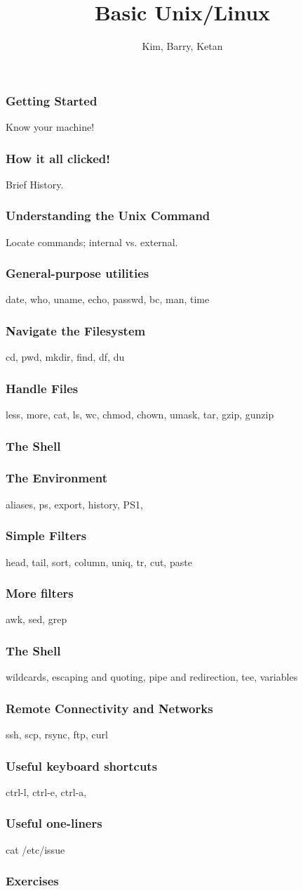 \documentclass[hyperref={pdfpagelabels=false},12pt]{beamer}
\title[Basic Unix/Linux]{{Basic Unix/Linux}}
\author[Basic Unix/Linux]{{Kim, Barry, Ketan}}
\date{}
\begin{document}
\begin{frame}[plain]
\titlepage
\end{frame}

\begin{frame}
\frametitle{Getting Started}
\centering
Know your machine!
\end{frame}

\begin{frame}
\frametitle{How it all clicked!}
\centering
Brief History.
\end{frame}

\begin{frame}
\frametitle{Understanding the Unix Command}
\centering
Locate commands; internal vs. external.
\end{frame}

\begin{frame}
\frametitle{General-purpose utilities}
\centering
date, who, uname, echo, passwd, bc, man, time
\end{frame}

\begin{frame}
\frametitle{Navigate the Filesystem}
\centering
cd, pwd, mkdir, find, df, du
\end{frame}

\begin{frame}
\frametitle{Handle Files}
\centering
less, more, cat, ls, wc, chmod, chown, umask, tar, gzip, gunzip
\end{frame}

\begin{frame}
\frametitle{The Shell}
\end{frame}

\begin{frame}
\frametitle{The Environment}
\centering
aliases, ps, export, history, PS1, 
\end{frame}

\begin{frame}
\frametitle{Simple Filters}
\centering
head, tail, sort, column, uniq, tr, cut, paste 
\end{frame}

\begin{frame}
\frametitle{More filters}
\centering
awk, sed, grep
\end{frame}

\begin{frame}
\frametitle{The Shell}
\centering
wildcards, escaping and quoting, pipe and redirection, tee, variables
\end{frame}

\begin{frame}
\frametitle{Remote Connectivity and Networks}
\centering
ssh, scp, rsync, ftp, curl
\end{frame}

\begin{frame}
\frametitle{Useful keyboard shortcuts}
\centering
ctrl-l, ctrl-e, ctrl-a, 
\end{frame}

\begin{frame}
\frametitle{Useful one-liners}
\centering
cat /etc/issue
\end{frame}

\begin{frame}
\frametitle{Exercises}
\end{frame}
\end{document}
